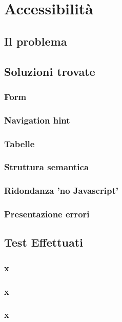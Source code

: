 \section{Accessibilità}
    \subsection{Il problema}
    \subsection{Soluzioni trovate}
        \subsubsection{Form}
        \subsubsection{Navigation hint}
        \subsubsection{Tabelle}
        \subsubsection{Struttura semantica}
        \subsubsection{Ridondanza 'no Javascript'}
        \subsubsection{Presentazione errori}
    \subsection{Test Effettuati}
        \subsubsection{x}
        \subsubsection{x}
        \subsubsection{x}
    
